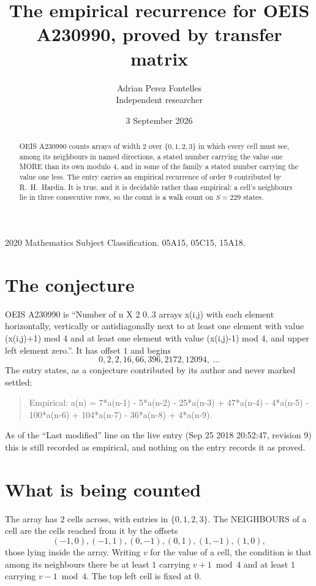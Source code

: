 \documentclass[11pt,a4paper]{article}
\title{The empirical recurrence for OEIS A230990, proved by transfer matrix}
\author{Adrian Perez Fontelles\\ \small Independent researcher}
\date{3 September 2026}
\theoremstyle{plain}
\theoremstyle{definition}
\begin{document}
\maketitle

\begin{abstract}
OEIS A230990 counts arrays of width $2$ over $\{0,1,2,3\}$ in which every cell must see, among its
neighbours in named directions, a stated number carrying the value one MORE than its own
modulo $4$, and in some of the family a stated number carrying the value one less. The entry
carries an empirical recurrence of order $9$ contributed by R.~H.~Hardin. It is true, and
it is decidable rather than empirical: a cell's neighbours lie in three consecutive rows, so
the count is a walk count on $S=229$ states.
\end{abstract}

\noindent\small 2020 Mathematics Subject Classification. 05A15, 05C15, 15A18.\normalsize

\section{The conjecture}

OEIS A230990 is ``Number of n X 2 0..3 arrays x(i,j) with each element horizontally, vertically or antidiagonally next to at least one element with value (x(i,j)+1) mod 4 and at least one element with value (x(i,j)-1) mod 4, and upper left element zero.''. It has offset $1$ and begins
\[
0, 2, 2, 16, 66, 396, 2172, 12094,\ \dots
\]
The entry states, as a conjecture contributed by its author and never marked settled:
\begin{quote}
Empirical: a(n) = 7*a(n-1) - 5*a(n-2) - 25*a(n-3) + 47*a(n-4) - 4*a(n-5) - 100*a(n-6) + 104*a(n-7) - 36*a(n-8) + 4*a(n-9).
\end{quote}
As of the ``Last modified'' line on the live entry (Sep 25 2018 20:52:47, revision 9) this is still
recorded as empirical, and nothing on the entry records it as proved.

\section{What is being counted}

The array has $2$ cells across, with entries in $\{0,1,2,3\}$. The NEIGHBOURS of a cell are the
cells reached from it by the offsets
\[
(-1,0), (-1,1), (0,-1), (0,1), (1,-1), (1,0),
\]
those lying inside the array. Writing $v$ for the value of a cell, the condition is that among
its neighbours there be at least $1$ carrying $v+1 \bmod 4$ and at least $1$ carrying $v-1 \bmod 4$. The top left
cell is fixed at $0$.
\end{document}

